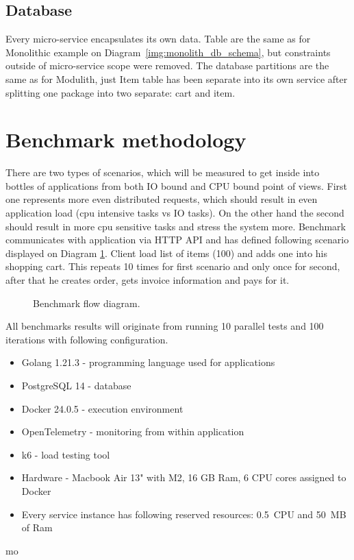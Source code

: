 \subsection{Database}
Every micro-service encapsulates its own data. Table are the same as for Monolithic example on Diagram~\ref{img:monolith_db_schema}, but constraints outside of micro-service scope were removed. The database partitions are the same as for Modulith, just Item table has been separate into its own service after splitting one package into two separate: cart and item.



\section{Benchmark methodology}
There are two types of scenarios, which will be measured to get inside into bottles of applications from both IO bound and CPU bound point of views. First one represents more even distributed requests, which should result in even application load (cpu intensive tasks vs IO tasks).
On the other hand the second should result in more cpu sensitive tasks and stress the system more.
Benchmark communicates with application via HTTP API and has defined following scenario displayed on Diagram \ref{img:benchmark_flow}.
Client load list of items (100) and adds one into his shopping cart. This repeats 10 times for first scenario and only once for second, after that he creates order, gets invoice information and pays for it.

\begin{figure}
    \centering
    
    \caption{Benchmark flow diagram. \label{img:benchmark_flow}}
\end{figure}

All benchmarks results will originate from running 10 parallel tests and 100 iterations with following configuration.
\begin{itemize}
    \item Golang 1.21.3 - programming language used for applications
    \item PostgreSQL 14 - database
    \item Docker 24.0.5 - execution environment
    \item OpenTelemetry - monitoring from within application
    \item k6 - load testing tool
    \item Hardware - Macbook Air 13" with M2, 16 GB Ram, 6 CPU cores assigned to Docker
    \item Every service instance has following reserved resources: 0.5~CPU and 50~MB of Ram
\end{itemize}mo


